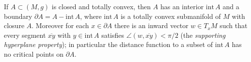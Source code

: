 \begin{lemma}
  \label{lem:pet-ch12-totally-convex-boundary-structure}
  If $A\subset(M,g)$ is closed and totally convex, then $A$ has an interior
  $\mathrm{int}\,A$ and a boundary $\partial A=A-\mathrm{int}\,A$, where
  $\mathrm{int}\,A$ is a totally convex submanifold of $M$ with closure $A$.
  Moreover for each $x\in\partial A$ there is an inward vector
  $w\in T_xM$ such that every segment $\overline{xy}$ with $y\in\mathrm{int}\,A$
  satisfies $\angle(w,\overline{xy})<\pi/2$ (the \emph{supporting hyperplane
  property}); in particular the distance function to a subset of
  $\mathrm{int}\,A$ has no critical points on $\partial A$.
\end{lemma}
